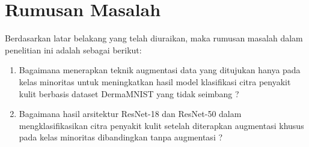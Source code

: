 \section{Rumusan Masalah} \label{I.Rumusan Masalah}
Berdasarkan latar belakang yang telah diuraikan, maka rumusan masalah 
dalam penelitian ini adalah sebagai berikut: \par

\begin{enumerate}
    \item Bagaimana menerapkan teknik augmentasi data yang ditujukan hanya pada kelas minoritas untuk meningkatkan hasil model klasifikasi citra penyakit kulit berbasis dataset DermaMNIST yang tidak seimbang ?
    \item Bagaimana hasil arsitektur ResNet-18 dan ResNet-50 dalam mengklasifikasikan citra penyakit kulit setelah diterapkan augmentasi khusus pada kelas minoritas dibandingkan tanpa augmentasi ?
\end{enumerate}





